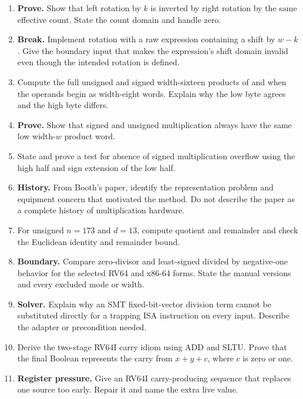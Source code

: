 \begin{enumerate}
\item \textbf{Prove.} Show that left rotation by \(k\) is inverted by right
rotation by the same effective count. State the count domain and handle zero.

\item \textbf{Break.} Implement rotation with a raw expression containing a
shift by \(w-k\). Give the boundary input that makes the expression's shift
domain invalid even though the intended rotation is defined.

\item Compute the full unsigned and signed width-sixteen products of
 and  when the operands begin as width-eight words. Explain
why the low byte agrees and the high byte differs.

\item \textbf{Prove.} Show that signed and unsigned multiplication always have
the same low width-\(w\) product word.

\item State and prove a test for absence of signed multiplication overflow
using the high half and sign extension of the low half.

\item \textbf{History.} From Booth's paper, identify the representation problem
and equipment concern that motivated the method. Do not describe the paper as
a complete history of multiplication hardware.

\item For unsigned \(n=173\) and \(d=13\), compute quotient and remainder and
check the Euclidean identity and remainder bound.

\item \textbf{Boundary.} Compare zero-divisor and least-signed divided by
negative-one behavior for the selected RV64 and x86-64 forms. State the manual
versions and every excluded mode or width.

\item \textbf{Solver.} Explain why an SMT fixed-bit-vector division term cannot
be substituted directly for a trapping ISA instruction on every input.
Describe the adapter or precondition needed.

\item Derive the two-stage RV64I carry idiom using ADD and SLTU. Prove that the
final Boolean represents the carry from \(x+y+c\), where \(c\) is zero or one.

\item \textbf{Register pressure.} Give an RV64I carry-producing sequence that
replaces one source too early. Repair it and name the extra live value.


\end{enumerate}
